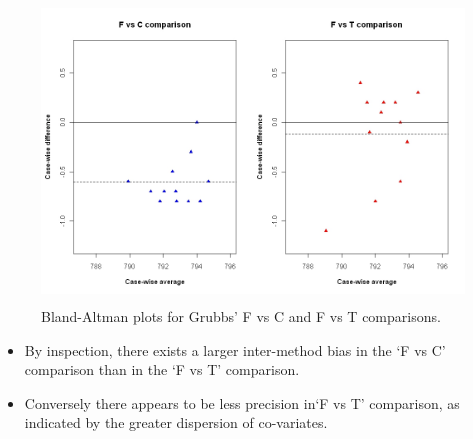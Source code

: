 \documentclass[compress]{beamer}        %
\begin{document}
\begin{frame}

\begin{figure}[h!]
\begin{center}
  \includegraphics[height=80mm]{GrubbsDataTwoBAplots.jpeg}
  \caption{Bland-Altman plots for Grubbs' F vs C and F vs T comparisons.}\label{GrubbsDataTwoBAplots}
\end{center}
\end{figure}
\end{frame}
\begin{frame}
\begin{itemize}
\item By inspection, there exists a larger inter-method bias in the `F
vs C' comparison than in the `F vs T' comparison. 
\item Conversely there
appears to be less precision in`F vs T' comparison, as indicated
by the greater dispersion of co-variates.


\end{itemize}

\end{frame}
\end{document}
